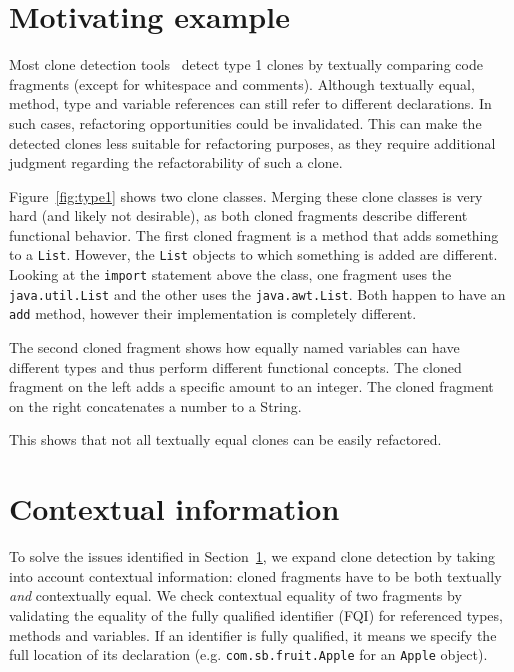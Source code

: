 \documentclass[conference]{IEEEtran}
\begin{document}
\section{Motivating example} \label{sec:type1}
Most clone detection tools~\cite{kamiya2002ccfinder, semura2017ccfindersw, roy2008nicad, svajlenko2016bigcloneeval, svajlenko2014evaluating} detect type 1 clones by textually comparing code fragments (except for whitespace and comments). Although textually equal, method, type and variable references can still refer to different declarations. In such cases, refactoring opportunities could be invalidated. This can make the detected clones less suitable for refactoring purposes, as they require additional judgment regarding the refactorability of such a clone.

Figure~\ref{fig:type1} shows two clone classes. Merging these clone classes is very hard (and likely not desirable), as both cloned fragments describe different functional behavior. The first cloned fragment is a method that adds something to a \texttt{List}. However, the \texttt{List} objects to which something is added are different. Looking at the \texttt{import} statement above the class, one fragment uses the \texttt{java.util.List} and the other uses the \texttt{java.awt.List}. Both happen to have an \texttt{add} method, however their implementation is completely different.

The second cloned fragment shows how equally named variables can have different types and thus perform different functional concepts. The cloned fragment on the left adds a specific amount to an integer. The cloned fragment on the right concatenates a number to a String.

This shows that not all textually equal clones can be easily refactored.

\section{Contextual information}
To solve the issues identified in Section~\ref{sec:type1}, we expand clone detection by taking into account contextual information: cloned fragments have to be both textually \textit{and} contextually equal. We check contextual equality of two fragments by validating the equality of the fully qualified identifier (FQI) for referenced types, methods and variables. If an identifier is fully qualified, it means we specify the full location of its declaration (e.g. \texttt{com.sb.fruit.Apple} for an \texttt{Apple} object).
\end{document}
